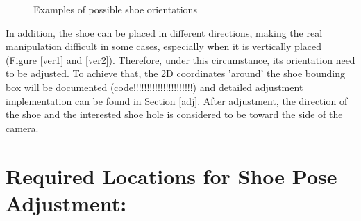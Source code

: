 \begin{figure}[H]
\centering
{}
\caption{Examples of possible shoe orientations}
\end{figure}

In addition, the shoe can be placed in different directions, making the real manipulation difficult in some cases, especially when it is vertically placed (Figure \ref{ver1} and \ref{ver2}). Therefore, under this circumstance, its orientation need to be adjusted. To achieve that, the 2D coordinates 'around' the shoe bounding box will be documented (code!!!!!!!!!!!!!!!!!!!!!!) and detailed adjustment implementation can be found in Section \ref{adj}. After adjustment, the direction of the shoe and the interested shoe hole is considered to be toward the side of the camera.

\section{Required Locations for Shoe Pose Adjustment:}

